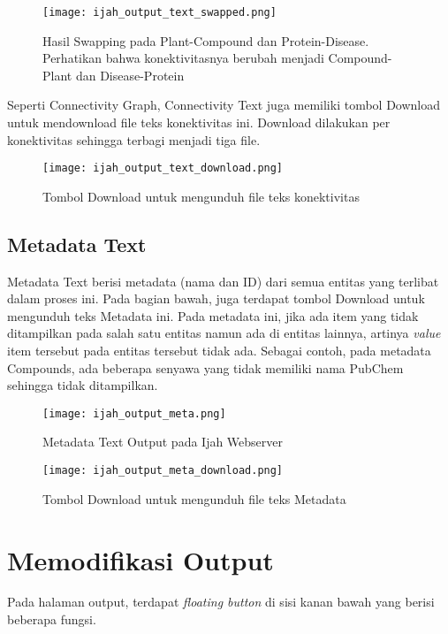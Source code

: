 	\begin{figure}[H]
	\centering
	\texttt{[image: ijah\_output\_text\_swapped.png]}
	\caption{Hasil Swapping pada Plant-Compound dan Protein-Disease. Perhatikan bahwa konektivitasnya berubah menjadi Compound-Plant dan Disease-Protein}
	\label{fig:ijah_output_text_swapped}
	\end{figure}

	Seperti Connectivity Graph, Connectivity Text juga memiliki tombol Download untuk mendownload file teks konektivitas ini. Download dilakukan per konektivitas sehingga terbagi menjadi tiga file.

	\begin{figure}[H]
	\centering
	\texttt{[image: ijah\_output\_text\_download.png]}
	\caption{Tombol Download untuk mengunduh file teks konektivitas}
	\label{fig:ijah_output_text_download}
	\end{figure}
	
	\subsection{Metadata Text} \label{meta}
	Metadata Text berisi metadata (nama dan ID) dari semua entitas yang terlibat dalam proses ini. Pada bagian bawah, juga terdapat tombol Download untuk mengunduh teks Metadata ini. Pada metadata ini, jika ada item yang tidak ditampilkan pada salah satu entitas namun ada di entitas lainnya, artinya \emph{value} item tersebut pada entitas tersebut tidak ada. Sebagai contoh, pada metadata Compounds, ada beberapa senyawa yang tidak memiliki nama PubChem sehingga tidak ditampilkan.

	\begin{figure}[H]
	\centering
	\texttt{[image: ijah\_output\_meta.png]}
	\caption{Metadata Text Output pada Ijah Webserver}
	\label{fig:ijah_output_meta}
	\end{figure}

	\begin{figure}[H]
	\centering
	\texttt{[image: ijah\_output\_meta\_download.png]}
	\caption{Tombol Download untuk mengunduh file teks Metadata}
	\label{fig:ijah_output_meta_download}
	\end{figure}


\section{Memodifikasi Output}
Pada halaman output, terdapat \emph{floating button} di sisi kanan bawah yang berisi beberapa fungsi.

